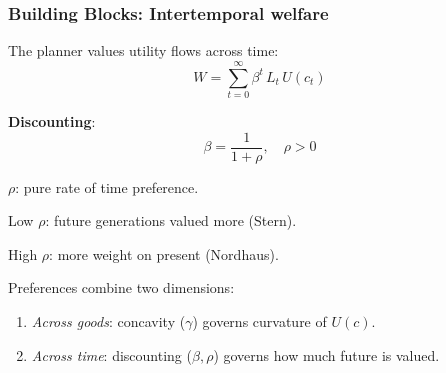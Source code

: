 \documentclass[xcolor=x11names,compress,aspectratio=169]{beamer}%
\makeatletter
\renewenvironment{itemize}{\begin{compactitemize}[<+-| alert@+>]}{\end{compactitemize}}
\makeatother
\begin{document}
\begin{frame}%
%

\frametitle{Building Blocks: Intertemporal welfare}%


\begin{itemize}
\item The planner values utility flows across time:
\[
W = \sum_{t=0}^{\infty}\beta^{t} \, L_{t} \, U(c_{t})
\]
\vspace{0.3cm}

\item \textbf{Discounting}:
\[
\beta= \frac{1}{1+\rho}, \quad\rho> 0
\]


\begin{itemize}
\item $\rho$: pure rate of time preference.

\item Low $\rho$: future generations valued more (Stern).

\item High $\rho$: more weight on present (Nordhaus).
\end{itemize}

\vspace{0.3cm}

\item Preferences combine two dimensions:

\begin{enumerate}
\item \emph{Across goods}: concavity ($\gamma$) governs curvature of $U(c)$.

\item \emph{Across time}: discounting ($\beta, \rho$) governs how much future
is valued.
\end{enumerate}
\end{itemize}

%

\transboxout
\end{frame}%
%
\end{document}
